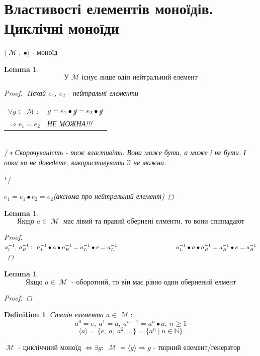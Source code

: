 \documentclass[a4paper,12pt, centered]{bookest}
\newtheorem{lemma}[theorem]{Lemma}
\newtheorem{definition}{Definition}[section]
\DeclareMathOperator{\Mm}{\mathcal{M}}
\newcommand\tab[1][1cm]{\hspace*{#1}}
\begin{document}
\section{Властивості елементів моноїдів. Циклічні моноїди}
$\langle \Mm,\>\bullet\rangle$ - моноїд
\begin{lemma}
		$$\textrm{У }\Mm\textrm{ існує лише одін нейтральний елемент}$$
		\begin{proof}$ $
			Нехай $e_1,\>e_2$ - нейтральні елементи
\begin{tabular}{cl}
{\color{red}\rlap{\rule[2.5pt]{6cm}{1pt}}}$\forall g\in \Mm:$ & $g=e_1\bullet \cancel{g}=e_2\bullet \cancel{g}$\\
  {\color{red}\rlap{\smash{\makebox[7ex]{\rule[-2pt]{1pt}{35pt}}}}} $\Rightarrow e_1=e_2$ & {\color{red} НЕ МОЖНА!!!}
\end{tabular}\\$\slash*\\$Скорочуваність - теж властивіть. Вона може бути, а може і не бути. І опки ви не доведете, використовувати її не можна.\begin{flushright}
$*\slash$
\end{flushright}
$e_1=e_1\bullet e_2=e_2$(аксіома про нейтральний елемент)
		\end{proof}
\end{lemma}
\begin{lemma}
	$$\textrm{Якщо }a\in \Mm\textrm{ має лівий та правий обернені елменти, то вони співпадают}$$
	\begin{proof}
		$a_l^{-1},\>a_R^{-1}:\>\>a_L^{-1}\bullet a\bullet a_R^{-1}=a_L^{-1}\bullet e=a_L^{-1}\\\tab\tab\tab\>\>\>\> 
		a_L^{-1}\bullet a\bullet a_R^{-1}=a_R^{-1}\bullet e=a_R^{-1}$
	\end{proof}
\end{lemma}
\begin{lemma}
	$$\textrm{Якщо }a\in \Mm\textrm{ - оборотний, то він має рівно один обернений елмент}$$
	\begin{proof}
		
	\end{proof}
\end{lemma}
\begin{definition}Степін елемента $a\in\Mm:$
	$$a^0=e,\>a^1=a,\>a^{n+1}=a^n\bullet a,\>n\geq1$$
	$$\langle a\rangle=\{e,\>a,\>a^2,\dots\}=\{a^n\>|\>n\in\mathbb{N}\}$$
\end{definition}
$\Mm$ - цикліччний моноїд $\Leftrightarrow\exists g:\>\Mm=\langle g\rangle\Rightarrow g$ - твірний елемент/генератор
\end{document}
